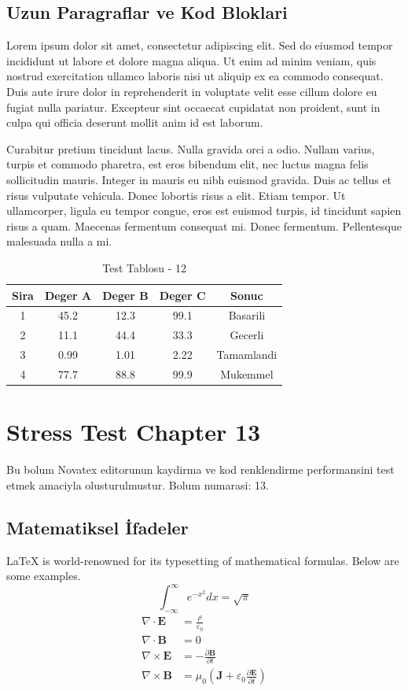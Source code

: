 \documentclass[12pt,a4paper]{article}
\begin{document}
\subsection{Uzun Paragraflar ve Kod Bloklari}
Lorem ipsum dolor sit amet, consectetur adipiscing elit. Sed do eiusmod tempor incididunt ut labore et dolore magna aliqua. Ut enim ad minim veniam, quis nostrud exercitation ullamco laboris nisi ut aliquip ex ea commodo consequat. Duis aute irure dolor in reprehenderit in voluptate velit esse cillum dolore eu fugiat nulla pariatur. Excepteur sint occaecat cupidatat non proident, sunt in culpa qui officia deserunt mollit anim id est laborum.

Curabitur pretium tincidunt lacus. Nulla gravida orci a odio. Nullam varius, turpis et commodo pharetra, est eros bibendum elit, nec luctus magna felis sollicitudin mauris. Integer in mauris eu nibh euismod gravida. Duis ac tellus et risus vulputate vehicula. Donec lobortis risus a elit. Etiam tempor. Ut ullamcorper, ligula eu tempor congue, eros est euismod turpis, id tincidunt sapien risus a quam. Maecenas fermentum consequat mi. Donec fermentum. Pellentesque malesuada nulla a mi.

\begin{table}[h!]
\centering
\begin{tabular}{|c|c|c|c|c|}
\hline
\textbf{Sira} & \textbf{Deger A} & \textbf{Deger B} & \textbf{Deger C} & \textbf{Sonuc} \\
\hline
1 & 45.2 & 12.3 & 99.1 & Basarili \\
2 & 11.1 & 44.4 & 33.3 & Gecerli \\
3 & 0.99 & 1.01 & 2.22 & Tamamlandi \\
4 & 77.7 & 88.8 & 99.9 & Mukemmel \\
\hline
\end{tabular}
\caption{Test Tablosu - 12}
\end{table}

\newpage
\section{Stress Test Chapter 13}
Bu bolum Novatex editorunun kaydirma ve kod renklendirme performansini test etmek amaciyla olusturulmustur. Bolum numarasi: 13.

\subsection{Matematiksel İfadeler}
\LaTeX{} is world-renowned for its typesetting of mathematical formulas. Below are some examples.
\begin{equation}
\int_{-\infty}^{\infty} e^{-x^2} dx = \sqrt{\pi}
\end{equation}
\begin{align}
\nabla \cdot \mathbf{E} &= \frac{\rho}{\varepsilon_0} \\
\nabla \cdot \mathbf{B} &= 0 \\
\nabla \times \mathbf{E} &= -\frac{\partial \mathbf{B}}{\partial t} \\
\nabla \times \mathbf{B} &= \mu_0\left(\mathbf{J} + \varepsilon_0 \frac{\partial \mathbf{E}}{\partial t}\right)
\end{align}
\end{document}
